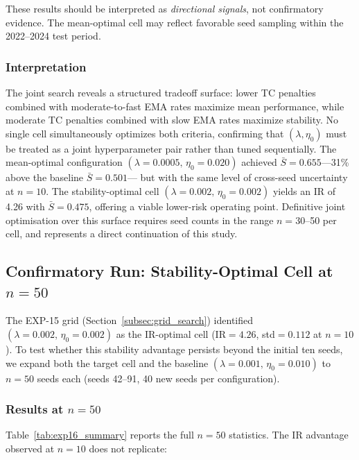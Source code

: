 \documentclass[conference]{IEEEtran}
\begin{document}
These results should be interpreted as \emph{directional signals},
not confirmatory evidence. The mean-optimal cell may reflect
favorable seed sampling within the 2022--2024 test period.

\subsubsection{Interpretation}

The joint search reveals a structured tradeoff surface: lower TC
penalties combined with moderate-to-fast EMA rates maximize mean
performance, while moderate TC penalties combined with slow EMA
rates maximize stability. No single cell simultaneously optimizes
both criteria, confirming that $(\lambda, \eta_0)$ must be treated
as a joint hyperparameter pair rather than tuned sequentially.
The mean-optimal configuration $(\lambda=0.0005,\,\eta_0=0.020)$
achieved $\bar{S}=0.655$---31\% above the baseline $\bar{S}=0.501$---
but with the same level of cross-seed uncertainty at $n=10$.
The stability-optimal cell $(\lambda=0.002,\,\eta_0=0.002)$ yields
an IR of 4.26 with $\bar{S}=0.475$, offering a viable lower-risk
operating point. Definitive joint optimisation over this surface
requires seed counts in the range $n=30$--50 per cell, and
represents a direct continuation of this study.

\subsection{Confirmatory Run: Stability-Optimal Cell at $n=50$}
\label{subsec:confirm_stability}

The EXP-15 grid (Section~\ref{subsec:grid_search}) identified
$(\lambda=0.002,\,\eta_0=0.002)$ as the IR-optimal cell
(IR$=4.26$, std$=0.112$ at $n=10$). To test whether this
stability advantage persists beyond the initial ten seeds,
we expand both the target cell and the baseline
$(\lambda=0.001,\,\eta_0=0.010)$ to $n=50$ seeds each
(seeds 42--91, 40 new seeds per configuration).

\subsubsection{Results at $n=50$}

Table~\ref{tab:exp16_summary} reports the full $n=50$ statistics.
The IR advantage observed at $n=10$ does not replicate:
\end{document}
